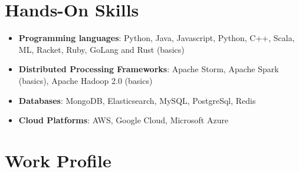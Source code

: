 \documentclass{article}
\begin{document}
\section{Hands-On Skills }
\begin{itemize}[leftmargin=-0.1ex]\setlength\itemsep{0.25em}\vspace{-10pt}
  \item \textbf{Programming languages}: Python, Java, Javascript, Python, C++,  Scala, ML, Racket, Ruby, GoLang and Rust (basics)
  \item \textbf{Distributed Processing Frameworks}: Apache Storm, Apache Spark (basics), Apache Hadoop 2.0 (basics)
   \item \textbf{Databases}: MongoDB, Elasticsearch, MySQL, PostgreSql, Redis
   \item \textbf{Cloud Platforms}: AWS, Google Cloud, Microsoft Azure
\end{itemize}\vspace{-3pt}
  
\section{Work Profile}
\end{document}
